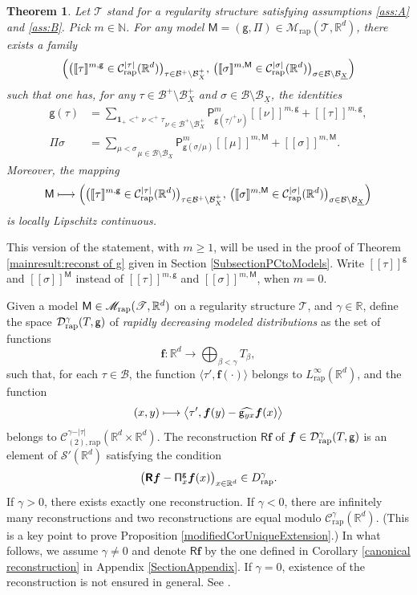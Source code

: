 \documentclass[JEP,XML,SOM,Unicode,published]{cedram}
\newcommand\mto{\mathchoice{\longmapsto}{\mapsto}{\mapsto}{\mapsto}}
\theoremstyle{plain}
\newtheorem{thm}{Theorem}
\theoremstyle{definition}
\newcommand{\unit}{\mathbf{1}}
\newcommand{\Brac}[1]{[\![#1]\!]}
\newcommand{\bsf}{\boldsymbol{f}}
\newcommand{\rap}{\mathrm{rap}}
\newcommand{\reR}{\boldsymbol{\mathsf{R}}}
\newcommand{\sfM}{\mathsf{M}}
\newcommand{\sfP}{\mathsf{P}}
\newcommand{\sfg}{\mathsf{g}}
\newcommand{\sfPi}{\mathsf{\Pi}}
\newcommand{\scrM}{\mathscr{M}}
\newcommand{\scrT}{\mathscr{T}}
\newcommand{\bbN}{\mathbb{N}}
\newcommand{\bbR}{\mathbb{R}}
\newcommand{\mcB}{\mathcal{B}}
\newcommand{\mcC}{\mathcal{C}}
\newcommand{\mcD}{\mathcal{D}}
\newcommand\mcS{\mathcal{S}}
\begin{document}
\begin{thm}\label{PropDefnBracket}
Let $\scrT$ stand for a regularity structure satisfying assumptions \eqref{ass:A} and \eqref{ass:B}. Pick $m\in\bbN$. For any model $\sfM=(\sfg,\sfPi)\in\scrM_\rap(\scrT,\bbR^d)$, there exists a family
\[
\Bigl(\bigl(\Brac{\tau}^{m,\sfg}\in \mcC^{\vert\tau\vert}_\rap(\bbR^d)\bigr)_{\tau\in\mcB^+\setminus\mcB_X^+}, \, \bigl(\Brac{\sigma}^{m,\sfM}\in \mcC^{\vert\sigma\vert}_\rap(\bbR^d)\bigr)_{\sigma\in\mcB\setminus \mcB_{\underline{X}}} \Bigr)
\]
such that one has, for any $\tau\in\mcB^+\setminus\mcB_X^+$ and $\sigma\in\mcB\setminus \mcB_{\underline{X}}$, the identities
\begin{align}
\label{def:bracket g}
\sfg(\tau) &= \underset{\nu\in\mcB^+\setminus\mcB_X^+}{\sum_{\unit_+<^+\nu<^+\tau}} \sfP^m_{\sfg(\tau/^+\nu)}\Brac{\nu}^{m,\sfg} + \Brac{\tau}^{m,\sfg}, \\
\label{def:bracket Pi}
\sfPi\sigma &= \underset{\mu\in\mcB\setminus \mcB_{\underline{X}}}{\sum_{\mu<\sigma}} \sfP^m_{\sfg(\sigma/\mu)}\Brac{\mu}^{m,\sfM} + \Brac{\sigma}^{m,\sfM}.
\end{align}
Moreover, the mapping
\[
\sfM \mto \Bigl(\bigl(\Brac{\tau}^{m,\sfg}\in \mcC^{\vert\tau\vert}_\rap(\bbR^d)\bigr)_{\tau\in\mcB^+\setminus\mcB_X^+}, \, \bigl(\Brac{\sigma}^{m,\sfM}\in \mcC^{\vert\sigma\vert}_\rap(\bbR^d)\bigr)_{\sigma\in\mcB\setminus \mcB_{\underline{X}}} \Bigr)
\]
is locally Lipschitz continuous.
\end{thm}

This version of the statement, with $m\geq 1$, will be used in the proof of Theorem \ref{mainresult:reconst of g} given in Section \ref{SubsectionPCtoModels}. Write $\Brac{\tau}^\sfg$ and $\Brac{\sigma}^\sfM$ instead of $\Brac{\tau}^{m,\sfg}$ and $\Brac{\sigma}^{m,\sfM}$, when $m=0$.

Given a model ${\sf M}\in\scrM_\rap(\scrT,\bbR^d)$ on a regularity structure $\scrT$, and $\gamma\in\bbR$, define the space $\mcD^\gamma_\rap(T,\sf g)$ of \emph{rapidly decreasing modeled distributions} as the set of functions
\[
{\bsf} : \bbR^d\to\bigoplus_{\beta<\gamma} T_\beta,
\]
such that, for each $\tau\in\mcB$, the function $\langle\tau',{\bsf}(\cdot)\rangle$ belongs to $L^\infty_\rap(\bbR^d)$, and the function
\[
(x,y) \mto \big\langle\tau',{\bsf}(y) - \widehat{{\sf g}_{yx}}\bsf(x)\big\rangle
\]
belongs to $\mcC^{\gamma-\vert\tau\vert}_{(2),\rap}(\bbR^d\times\bbR^d)$. The reconstruction $\reR\bsf$ of $\bsf\in\mcD_{\rap}^\gamma(T,{\sf g})$ is an element of $\mcS'(\bbR^d)$ satisfying the condition
\[
\bigl(\reR\bsf - {\sf \Pi}^{\sfg}_x\bsf(x)\bigr)_{x\in\bbR^d}\in D^\gamma_\rap.
\]
If $\gamma>0$, there exists exactly one reconstruction. If $\gamma<0$, there are infinitely many reconstructions and two reconstructions are equal modulo $\mcC_{\rap}^\gamma(\bbR^d)$. (This is a key point to prove Proposition \ref{modifiedCorUniqueExtension}.) In what follows, we assume $\gamma\neq0$ and denote $\reR\bsf$ by the one defined in Corollary \ref{canonical reconstruction} in Appendix \ref{SectionAppendix}. If $\gamma=0$, existence of the reconstruction is not ensured in general. See \cite[Ex.\,5.5]{CZ}.
\end{document}
